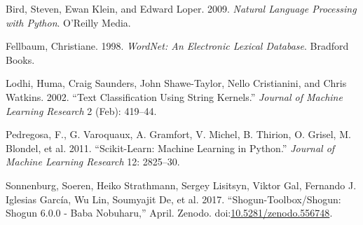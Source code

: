 \documentclass[format=acmtog]{acmart}
\begin{document}
\hypertarget{refs}{}
\hypertarget{ref-BirdKleinLoper09}{}
Bird, Steven, Ewan Klein, and Edward Loper. 2009. \emph{Natural Language
Processing with Python}. O'Reilly Media.

\hypertarget{ref-wordnet}{}
Fellbaum, Christiane. 1998. \emph{WordNet: An Electronic Lexical
Database}. Bradford Books.

\hypertarget{ref-lodhi2002text}{}
Lodhi, Huma, Craig Saunders, John Shawe-Taylor, Nello Cristianini, and
Chris Watkins. 2002. ``Text Classification Using String Kernels.''
\emph{Journal of Machine Learning Research} 2 (Feb): 419--44.

\hypertarget{ref-scikit-learn}{}
Pedregosa, F., G. Varoquaux, A. Gramfort, V. Michel, B. Thirion, O.
Grisel, M. Blondel, et al. 2011. ``Scikit-Learn: Machine Learning in
Python.'' \emph{Journal of Machine Learning Research} 12: 2825--30.

\hypertarget{ref-shogun_2017}{}
Sonnenburg, Soeren, Heiko Strathmann, Sergey Lisitsyn, Viktor Gal,
Fernando J. Iglesias García, Wu Lin, Soumyajit De, et al. 2017.
``Shogun-Toolbox/Shogun: Shogun 6.0.0 - Baba Nobuharu,'' April. Zenodo.
doi:\href{https://doi.org/10.5281/zenodo.556748}{10.5281/zenodo.556748}.
\end{document}
